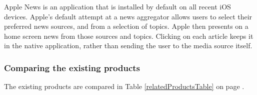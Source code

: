 \documentclass[12pt]{article}
\begin{document}
Apple News \cite{appleNews} is an application that is installed by default on all recent iOS devices. Apple's default attempt at a news aggregator allows users to select their preferred news sources, and from a selection of topics. Apple \cite{apple} then presents on a home screen news from those sources and topics. Clicking on each article keeps it in the native application, rather than sending the user to the media source itself.

\subsubsection{Comparing the existing products}

The existing products are compared in Table \ref{relatedProductsTable} on page \pageref{relatedProductsTable}.
\end{document}

